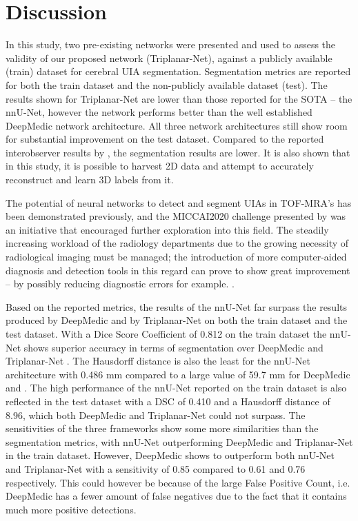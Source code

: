 \chapter{Discussion}
\label{chapter7}

In this study, two pre-existing networks were presented and used to assess the validity of our proposed network (Triplanar-Net), against a publicly available (train) dataset for cerebral UIA segmentation. Segmentation metrics are reported for both the train dataset and the non-publicly available dataset (test). The results shown for Triplanar-Net are lower than those reported for the SOTA -- the nnU-Net, however the network performs better than the well established DeepMedic network architecture. All three network architectures still show room for substantial improvement on the test dataset. Compared to the reported interobserver results by \citeauthor{Timmins2020}, the segmentation results are lower. It is also shown that in this study, it is possible to harvest 2D data and attempt to accurately reconstruct and learn 3D labels from it. 

The potential of neural networks to detect and segment UIAs in TOF-MRA's has been demonstrated previously, and the MICCAI2020 challenge presented by \citeauthor{Timmins2020} was an initiative that encouraged further exploration into this field. The steadily increasing workload of the radiology departments due to the growing necessity of radiological imaging must be managed; the introduction of more computer-aided diagnosis and detection tools in this regard can prove to show great improvement -- by possibly reducing diagnostic errors for example. .

Based on the reported metrics, the results of the nnU-Net far surpass the results produced by DeepMedic and by Triplanar-Net on both the train dataset and the test dataset. With a Dice Score Coefficient of 0.812 on the train dataset the nnU-Net shows superior accuracy in terms of segmentation over DeepMedic and Triplanar-Net . The Hausdorff distance is also the least for the nnU-Net architecture with 0.486 mm compared to a large value of 59.7 mm for DeepMedic and . The high performance of the nnU-Net reported on the train dataset is also reflected in the test dataset with a DSC of 0.410 and a Hausdorff distance of 8.96, which both DeepMedic and Triplanar-Net could not surpass. The sensitivities of the three frameworks show some more similarities than the segmentation metrics, with nnU-Net outperforming DeepMedic and Triplanar-Net in the train dataset. However, DeepMedic shows to outperform both nnU-Net and Triplanar-Net with a sensitivity of 0.85 compared to 0.61 and 0.76 respectively. This could however be because of the large False Positive Count, i.e. DeepMedic has a fewer amount of false negatives due to the fact that it contains much more positive detections.

